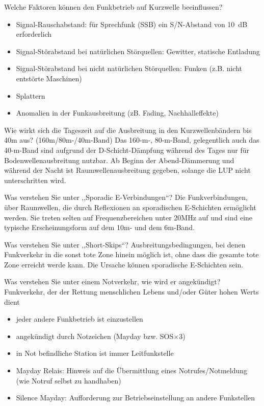 \documentclass[avery5371,grid,frame,a4paper]{flashcards}
\newcommand{\card}[3]{
  \begin{flashcard}[{\chap} -- #1]{#2}#3\end{flashcard}
}
\begin{document}
\card{29}{Welche Faktoren können den Funkbetrieb auf Kurzwelle beeinflussen?}{
  \small
  \begin{itemize}
    \item Signal-Rauschabstand: für Sprechfunk (SSB) ein S/N-Abstand von 10~dB erforderlich
    \item Signal-Störabstand bei natürlichen Störquellen: Gewitter, statische Entladung
    \item Signal-Störabstand bei nicht natürlichen Störquellen: Funken (z.B. nicht entstörte Maschinen)
    \item Splattern
    \item Anomalien in der Funkausbreitung (zB. Fading, Nachhalleffekte)
  \end{itemize}
}
\card{30}{Wie wirkt sich die Tageszeit auf die Ausbreitung in den Kurzwellenbändern bis 40m aus? (160m/80m-/40m-Band)}{
  Das 160-m-, 80-m-Band, gelegentlich auch das 40-m-Band sind aufgrund der D-Schicht-Dämpfung während des Tages nur für Bodenwellenausbreitung nutzbar. Ab Beginn der Abend-Dämmerung und während der Nacht ist Raumwellenausbreitung gegeben, solange die LUP nicht unterschritten wird.
}
\card{31}{Was verstehen Sie unter ,,Sporadic E-Verbindungen``?}{
  Die Funkverbindungen, über Raumwellen, die durch Reflexionen an sporadischen E-Schichten ermöglicht werden. Sie treten selten auf Frequenzbereichen unter 20MHz auf und sind eine typische Erscheinungsform auf dem 10m- und dem 6m-Band.
}
\card{32}{Was verstehen Sie unter ,,Short-Skips``?}{
  Ausbreitungsbedingungen, bei denen Funkverkehr in die sonst tote Zone hinein möglich ist, ohne dass die gesamte tote Zone erreicht werde kann. Die Ursache können sporadische E-Schichten sein.
}
\card{33}{Was verstehen Sie unter einem Notverkehr, wie wird er angekündigt?}{
  \small
  Funkverkehr, der der Rettung menschlichen Lebens und/oder Güter hohen Werts dient
  \begin{itemize}\itemsep1pt
    \item jeder andere Funkbetrieb ist einzustellen
    \item angekündigt durch Notzeichen {\footnotesize (Mayday bzw. SOS$\times 3$)}
    \item in Not befindliche Station ist immer Leitfunkstelle
    \item Mayday Relais: Hinweis auf die Übermittlung eines Notrufes/Notmeldung (wie Notruf selbst zu handhaben)
    \item Silence Mayday: Aufforderung zur Betriebseinstellung an andere Funkstellen
  \end{itemize}
}
\end{document}

